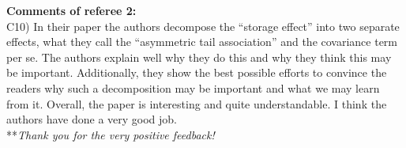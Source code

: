 \documentclass[letterpaper,11pt]{article}
\begin{document}
\noindent \textbf{Comments of referee 2:} \\

\noindent C10) In their paper the authors decompose the “storage effect” into two separate effects, what they call the “asymmetric tail association” and the covariance term per se. The authors explain well why they do this and why they think this may be important. Additionally, they show the best possible efforts to convince the readers why such a decomposition may be important and what we may learn from it. Overall, the paper is interesting and quite understandable. I think the authors have done a very good job. \\

\noindent ***\emph{Thank you for the very positive feedback!} \\
\end{document}
